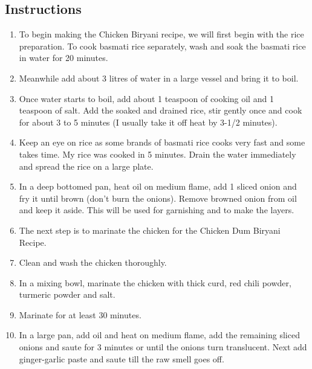 \documentclass{recipe}
\begin{document}
        \subsection{Instructions}
        \begin{enumerate}
            \item To begin making the Chicken Biryani recipe, we will first begin with the rice preparation. To cook basmati rice separately, wash and soak the basmati rice in water for 20 minutes.

            \item Meanwhile add about 3 litres of water in a large vessel and bring it to boil.
            
            \item Once water starts to boil, add about 1 teaspoon of cooking oil and 1 teaspoon of salt. Add the soaked and drained rice, stir gently once and cook for about 3 to 5 minutes (I usually take it off heat by 3-1/2 minutes).
            
            \item Keep an eye on rice as some brands of basmati rice cooks very fast and some takes time. My rice was cooked in 5 minutes. Drain the water immediately and spread the rice on a large plate.
            
            \item In a deep bottomed pan, heat oil on medium flame,  add 1 sliced onion and fry it until brown (don’t burn the onions). Remove browned onion from oil and keep it aside. This will be used for garnishing and to make the layers.
            
            \item The next step is to marinate the chicken for the Chicken Dum Biryani Recipe.
            
            \item Clean and wash the chicken thoroughly.
            
            \item In a mixing bowl, marinate the chicken with thick curd, red chili powder, turmeric powder and salt.
            
            \item Marinate for at least 30 minutes. 
            
            \item In a large pan, add oil and heat on medium flame, add the remaining sliced onions and saute for 3 minutes or until the onions turn translucent. Next add ginger-garlic paste and saute till the raw smell goes off.
            

\end{enumerate}
\end{document}
